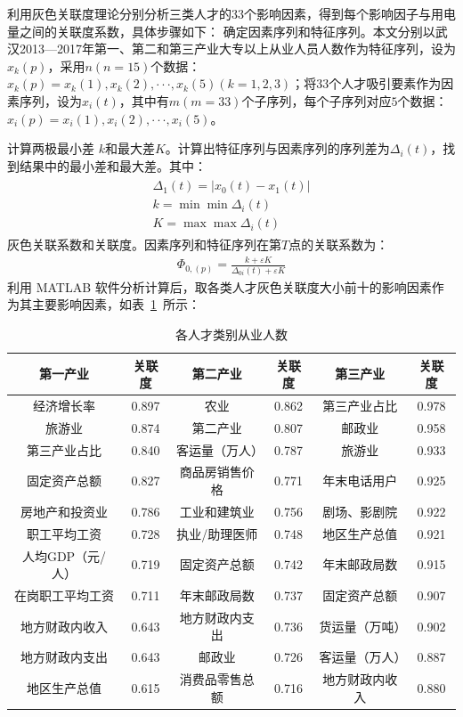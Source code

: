 \documentclass{whutmod}
\begin{document}
	利用灰色关联度理论分别分析三类人才的$33$个影响因素，得到每个影响因子与用电量之间的关联度系数，具体步骤如下：
	确定因素序列和特征序列。本文分别以武汉2013—2017年第一、第二和第三产业大专以上从业人员人数作为特征序列，设为$x_{k}(p)$，采用$n(n=15)$个数据：$x_{k}(p)={x_{k}(1),x_{k}(2),···,x_{k}(5)}(k=1,2,3)$；将$33$个人才吸引要素作为因素序列，设为$x_{i}(t)$，其中有$m(m=33)$个子序列，每个子序列对应$5$个数据：$x_{i}(p)={x_{i}(1),x_{i}(2),···,x_{i}(5)}$。
	
	计算两极最小差 $k$和最大差$K$。计算出特征序列与因素序列的序列差为$\Delta _{i}(t)$，找到结果中的最小差和最大差。其中：
	\begin{gather}
	\begin{array} { l } { \Delta _ { 1 } ( t ) = \left| x _ { 0 } ( t ) - x _ { 1 } ( t ) \right| } \\ { k = \min \min \Delta _ { i } ( t ) } \\ { K = \max \max \Delta _ { i } ( t ) } \end{array}
	\end{gather}
	灰色关联系数和关联度。因素序列和特征序列在第$T$点的关联系数为：
	\begin{gather}
	\Phi _ { 0 , ( p ) } = \frac { k + \varepsilon K } { \Delta _ { 0 i } ( t ) + \varepsilon K }
	\end{gather}
	利用 MATLAB 软件分析计算后，取各类人才灰色关联度大小前十的影响因素作为其主要影响因素，如表~\ref{guan}~所示：
		\begin{table}[H]
		\centering
		\caption{各人才类别从业人数}\label{guan}
		\begin{tabular}{cccccc}
			\toprule[2pt]
			\multicolumn{1}{m{3cm}}{\centering 第一产业}&
			\multicolumn{1}{m{1.5cm}|}{\centering 关联度} & \multicolumn{1}{m{3cm}}{\centering 第二产业} & \multicolumn{1}{m{1.5cm}|}{\centering 关联度}&
			\multicolumn{1}{m{3cm}}{\centering 第三产业} & \multicolumn{1}{m{1.5cm}}{\centering 关联度}\\
			\midrule[1pt]
			经济增长率	 &  0.897 & 农业&0.862&第三产业占比&0.978\\ 
			旅游业 &  0.874&第二产业&0.807&邮政业&0.958\\ 
			第三产业占比	 &  0.840&客运量（万人）&0.787&旅游业&0.933\\ 
			固定资产总额&  0.827& 商品房销售价格&0.771&年末电话用户&0.925\\ 
			房地产和投资业  & 0.786& 工业和建筑业&0.756&剧场、影剧院&0.922\\
			职工平均工资  &0.728& 执业/助理医师&0.748&地区生产总值&0.921\\
			人均GDP（元/人）  & 0.719& 固定资产总额&0.742&年末邮政局数&0.915\\
			在岗职工平均工资  & 0.711& 年末邮政局数&0.737&固定资产总额&0.907\\
			地方财政内收入  & 0.643& 地方财政内支出&0.736&货运量（万吨）&0.902\\
			地方财政内支出&0.643& 邮政业&0.726&客运量（万人）&0.887\\
			地区生产总值&0.615&消费品零售总额&0.716&地方财政内收入&0.880\\
			\bottomrule[2pt]
		\end{tabular}
	\end{table}
	
\end{document}
